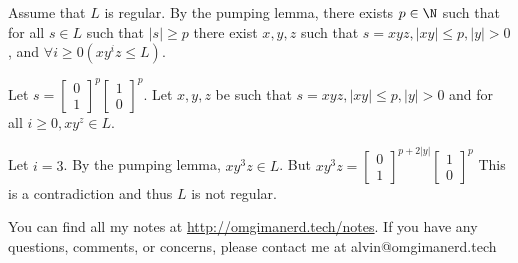 \documentclass{math}
\begin{document}
Assume that \( L \) is regular. By the pumping lemma, there exists \( p\in\N \)
such that for all \( s\in L \) such that \( |s|\ge p \) there exist \( x,y,z \)
such that \( s = xyz, |xy|\le p, |y|>0 \), and \( \forall{i}\ge0(xy^iz\le L) \).
\par
Let \( s = \begin{bmatrix}0 \\ 1\end{bmatrix}^p
\begin{bmatrix}1 \\ 0\end{bmatrix}^p \). Let \( x,y,z \) be such that
\( s = xyz, |xy|\le p, |y|>0 \) and for all \( i\ge0, xy^z\in L \). \par
Let \( i = 3 \). By the pumping lemma, \( xy^3z\in L \). But \( xy^3z =
\begin{bmatrix}0 \\ 1\end{bmatrix}^{p+2|y|}
\begin{bmatrix}1 \\ 0\end{bmatrix}^p \) This is a contradiction and thus \( L \)
is not regular.

\begin{center}
  You can find all my notes at \url{http://omgimanerd.tech/notes}. If you have
  any questions, comments, or concerns, please contact me at
  alvin@omgimanerd.tech
\end{center}
\end{document}
